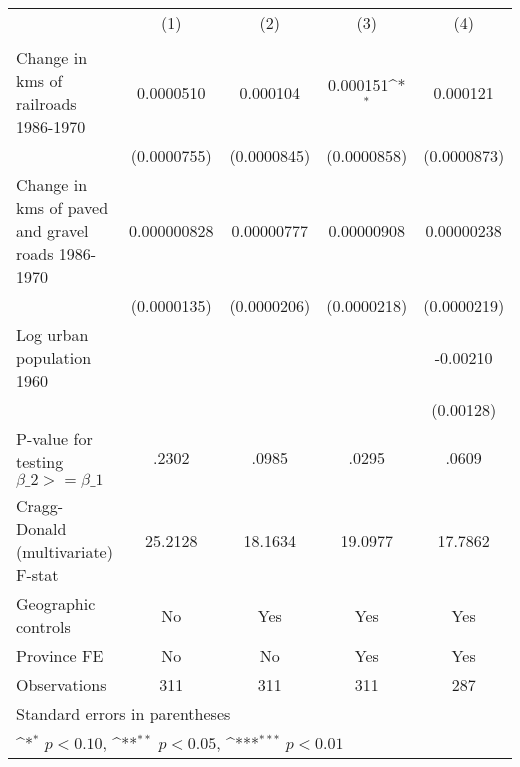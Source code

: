 {
\def\sym#1{\ifmmode^{#1}\else\(^{#1}\)\fi}
\begin{tabular}{l*{4}{c}}
\hline\hline
                &\multicolumn{1}{c}{(1)}&\multicolumn{1}{c}{(2)}&\multicolumn{1}{c}{(3)}&\multicolumn{1}{c}{(4)}\\
                &\multicolumn{1}{c}{}&\multicolumn{1}{c}{}&\multicolumn{1}{c}{}&\multicolumn{1}{c}{}\\
\hline
Change in kms of railroads 1986-1970&0.0000510         & 0.000104         & 0.000151\sym{*}  & 0.000121         \\
                &(0.0000755)         &(0.0000845)         &(0.0000858)         &(0.0000873)         \\
[1em]
Change in kms of paved and gravel roads 1986-1970&0.000000828         &0.00000777         &0.00000908         &0.00000238         \\
                &(0.0000135)         &(0.0000206)         &(0.0000218)         &(0.0000219)         \\
[1em]
Log urban population 1960&                  &                  &                  & -0.00210         \\
                &                  &                  &                  &(0.00128)         \\
\hline
P-value for testing $\beta\_{2} >= \beta\_{1}$&    .2302         &    .0985         &    .0295         &    .0609         \\
Cragg-Donald (multivariate) F-stat&  25.2128         &  18.1634         &  19.0977         &  17.7862         \\
Geographic controls&       No         &      Yes         &      Yes         &      Yes         \\
Province FE     &       No         &       No         &      Yes         &      Yes         \\
Observations    &      311         &      311         &      311         &      287         \\
\hline\hline
\multicolumn{5}{l}{\footnotesize Standard errors in parentheses}\\
\multicolumn{5}{l}{\footnotesize \sym{*} \(p<0.10\), \sym{**} \(p<0.05\), \sym{***} \(p<0.01\)}\\
\end{tabular}
}
